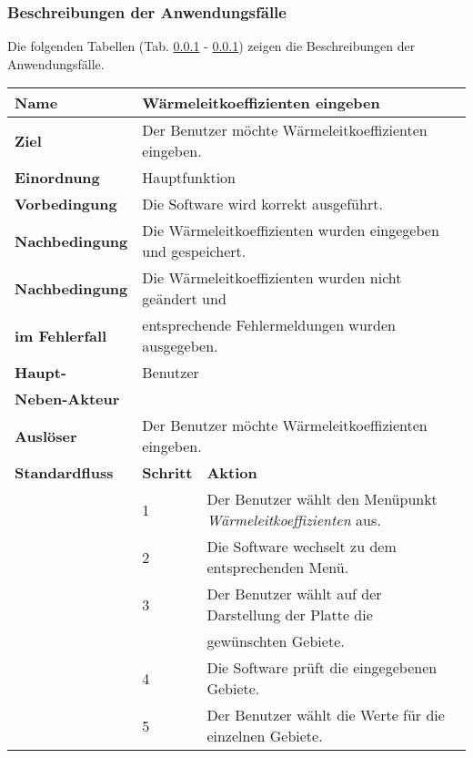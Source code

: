 \subsubsection{Beschreibungen der Anwendungsfälle}
Die folgenden Tabellen (Tab. \ref{} - \ref{}) zeigen die Beschreibungen der Anwendungsfälle.

\begin{table} [H]
	\centering
	\begin{tabular}{|l|l|l|}
		\hline
		\textbf{Name} 			& \multicolumn{2}{|l|}{Wärmeleitkoeffizienten eingeben}  \\
		\hline
		\textbf{Ziel} 			& \multicolumn{2}{|l|}{Der Benutzer möchte Wärmeleitkoeffizienten eingeben. }\\ 
		\hline
		\textbf{Einordnung}		& \multicolumn{2}{|l|}{Hauptfunktion}\\
		\hline
		\textbf{Vorbedingung}	& \multicolumn{2}{|l|}{Die Software wird korrekt ausgeführt.} \\
		\hline
		\textbf{Nachbedingung}	& \multicolumn{2}{|l|}{Die Wärmeleitkoeffizienten wurden eingegeben und gespeichert.}\\
		\hline
		\textbf{Nachbedingung} 	& \multicolumn{2}{|l|}{Die Wärmeleitkoeffizienten wurden nicht geändert und}\\
		\textbf{im Fehlerfall}	& \multicolumn{2}{|l|}{entsprechende Fehlermeldungen wurden ausgegeben.}\\
		\hline
		\textbf{Haupt-} 			& \multicolumn{2}{|l|}{Benutzer}\\
		\textbf{Neben-Akteur}	& \multicolumn{2}{|l|}{	}			\\
		\hline
		\textbf{Auslöser} 		& \multicolumn{2}{|l|}{Der Benutzer möchte Wärmeleitkoeffizienten eingeben.} \\
		\hline 
		\textbf{Standardfluss} & \textbf{Schritt} & \textbf{Aktion} \\
		\hline
		&	1	& Der Benutzer wählt den Menüpunkt \emph{Wärmeleitkoeffizienten} aus. \\
		\cline{2-3}
		&	2	& Die Software wechselt zu dem entsprechenden Menü.\\
		\cline{2-3}
		&	3	& Der Benutzer wählt auf der Darstellung der Platte die \\
		&       & gewünschten Gebiete.\\
		\cline{2-3}
		&	4	& Die Software prüft die eingegebenen Gebiete.\\
		\cline{2-3}
		&	5	& Der Benutzer wählt die Werte für die einzelnen Gebiete.\\

\end{tabular}
\end{table}
